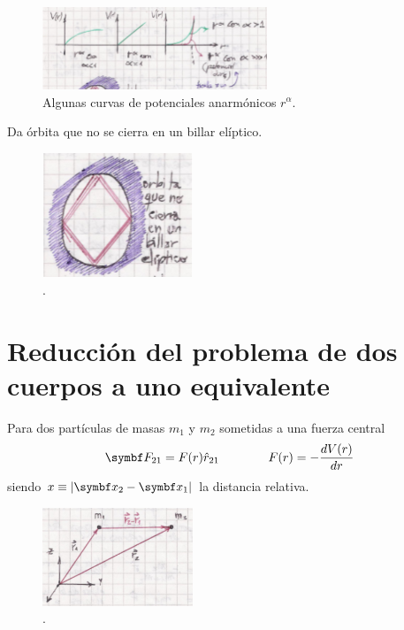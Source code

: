 \documentclass[10pt,oneside]{CBFT_book}
\begin{document}
\begin{figure}[hbt]
	\begin{center}
	\includegraphics[width=0.6\textwidth]{images/fig_mc_potenciales_otro.pdf}
	\end{center}
	\caption{Algunas curvas de potenciales anarmónicos $ r^\alpha $.}
\end{figure}

Da órbita que no se cierra en un billar elíptico.

\begin{figure}[hbt]
	\begin{center}
	\includegraphics[width=0.4\textwidth]{images/fig_mc_billar.pdf}
	\end{center}
	\caption{.}
\end{figure}

\section{Reducción del problema de dos cuerpos a uno equivalente}

Para dos partículas de masas $ m_1 $ y $ m_2 $ sometidas a una fuerza central 
\[
	\vb{F}_{21} = F(r) \hat{r}_{21} \qquad \qquad F(r) = -\dtot{V(r)}{r}
\]
siendo $x \equiv |\vb{x}_2-\vb{x}_1|$ la distancia relativa.

\begin{figure}[hbt]
	\begin{center}
	\includegraphics[width=0.4\textwidth]{images/fig_mc_prob_equiv_scheme.pdf}	 
	\end{center}
	\caption{.}
	\label{fig_mc_prob_equiv_scheme}
\end{figure} 
\end{document}
